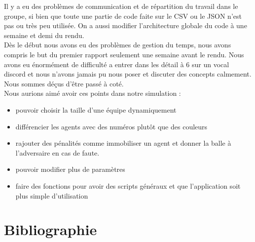 \documentclass[11pt, a4paper]{article}
\begin{document}
	Il y a eu des problèmes de communication et de répartition du travail dans le groupe, si bien que toute une partie de code faite sur le CSV ou le JSON n'est pas ou très peu utilisée. On a aussi modifier l'architecture globale du code à une semaine et demi du rendu.\\
	Dès le début nous avons eu des problèmes de gestion du temps, nous avons compris le but du premier rapport seulement une semaine avant le rendu. Nous avons eu énormément de difficulté a entrer dans les détail à 6 sur un vocal discord et nous n'avons jamais pu nous poser et discuter des concepts calmement. Nous sommes déçus d'être passé à coté. \\

	Nous aurions aimé avoir ces points dans notre simulation :

	\begin{itemize}
		\item pouvoir choisir la taille d'une équipe dynamiquement
		\item différencier les agents avec des numéros plutôt que des couleurs
		\item rajouter des pénalités comme immobiliser un agent et donner la balle à l'adversaire en cas de faute.
		\item pouvoir modifier plus de paramètres
		\item faire des fonctions pour avoir des scripts généraux et que l'application soit plus simple d'utilisation
	\end{itemize}

	\section{Bibliographie}
	
	
\end{document}
